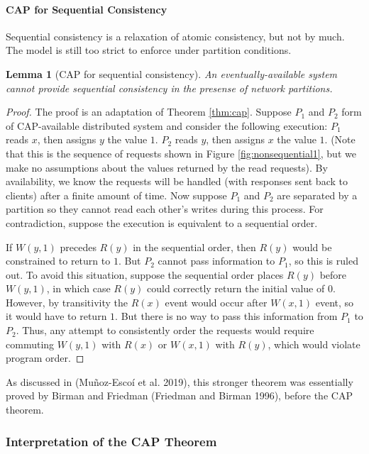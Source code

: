 \documentclass[]             %
{NASA}                       %
\newtheorem{lemma}[theorem]{Lemma}
\theoremstyle{definition}
\begin{document}
\paragraph{CAP for Sequential Consistency}

Sequential consistency is a relaxation of atomic consistency, but not by
much. The model is still too strict to enforce under partition
conditions.

\begin{lemma}[CAP for sequential consistency]
    \label{thm:cap-sequential}
    An eventually-available system cannot provide sequential consistency in the presense of network partitions.
\end{lemma}
\begin{proof}

The proof is an adaptation of Theorem \ref{thm:cap}. Suppose $P_1$ and
$P_2$ form of CAP-available distributed system and consider the
following execution: $P_1$ reads $x$, then assigns $y$ the value
$1$. $P_2$ reads $y$, then assigns $x$ the value $1$. (Note that this
is the sequence of requests shown in Figure \ref{fig:nonsequential1},
but we make no assumptions about the values returned by the read
requests). By availability, we know the requests will be handled (with
responses sent back to clients) after a finite amount of time. Now
suppose $P_1$ and $P_2$ are separated by a partition so they cannot
read each other's writes during this process. For contradiction,
suppose the execution is equivalent to a sequential order.

If $W(y,1)$ precedes $R(y)$ in the sequential order, then $R(y)$ would
be constrained to return to $1$. But $P_2$ cannot pass information to
$P_1$, so this is ruled out. To avoid this situation, suppose the
sequential order places $R(y)$ before $W(y,1)$, in which case $R(y)$
could correctly return the initial value of $0$. However, by
transitivity the $R(x)$ event would occur after $W(x,1)$ event, so it
would have to return $1$. But there is no way to pass this information
from $P_1$ to $P_2$. Thus, any attempt to consistently order the
requests would require commuting $W(y,1)$ with $R(x)$ or $W(x,1)$ with
$R(y)$, which would violate program order.
\end{proof}

As discussed in (Muñoz-Escoí et al. 2019), this stronger theorem was
essentially proved by Birman and Friedman (Friedman and Birman 1996),
before the CAP theorem.

\hypertarget{interpretation-of-the-cap-theorem}{%
\subsubsection{Interpretation of the CAP
Theorem}\label{interpretation-of-the-cap-theorem}}
\end{document}
